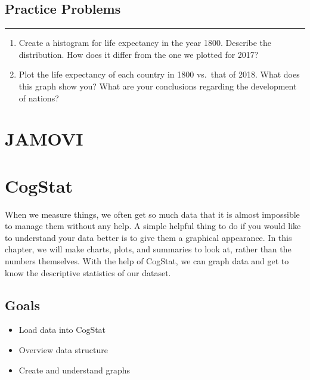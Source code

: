\documentclass[
]{book}
\begin{document}
\hypertarget{practice-problems}{%
\subsection{Practice Problems}\label{practice-problems}}

\begin{center}\rule{0.5\linewidth}{0.5pt}\end{center}

\begin{enumerate}
\def\labelenumi{\arabic{enumi}.}
\item
  Create a histogram for life expectancy in the year 1800. Describe the distribution. How does it differ from the one we plotted for 2017?
\item
  Plot the life expectancy of each country in 1800 vs.~that of 2018. What does this graph show you? What are your conclusions regarding the development of nations?
\end{enumerate}

\hypertarget{jamovi-1}{%
\section{JAMOVI}\label{jamovi-1}}

\hypertarget{cogstat-2}{%
\section{CogStat}\label{cogstat-2}}

When we measure things, we often get so much data that it is almost impossible to manage them without any help. A simple helpful thing to do if you would like to understand your data better is to give them a graphical appearance. In this chapter, we will make charts, plots, and summaries to look at, rather than the numbers themselves. With the help of CogStat, we can graph data and get to know the descriptive statistics of our dataset.

\hypertarget{goals}{%
\subsection{Goals}\label{goals}}

\begin{itemize}
\item
  Load data into CogStat
\item
  Overview data structure
\item
  Create and understand graphs
\end{itemize}
\end{document}
